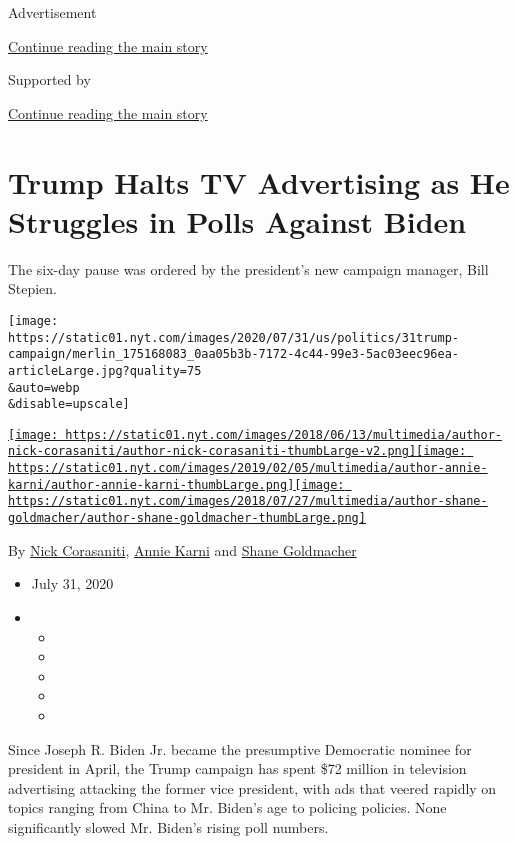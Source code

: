 Advertisement

\protect\hyperlink{after-top}{Continue reading the main story}

Supported by

\protect\hyperlink{after-sponsor}{Continue reading the main story}

\hypertarget{trump-halts-tv-advertising-as-he-struggles-in-polls-against-biden}{%
\section{Trump Halts TV Advertising as He Struggles in Polls Against
Biden}\label{trump-halts-tv-advertising-as-he-struggles-in-polls-against-biden}}

The six-day pause was ordered by the president's new campaign manager,
Bill Stepien.

\texttt{[image: https://static01.nyt.com/images/2020/07/31/us/politics/31trump-campaign/merlin\_175168083\_0aa05b3b-7172-4c44-99e3-5ac03eec96ea-articleLarge.jpg?quality=75\\\&auto=webp\\\&disable=upscale]}

\href{https://www.nytimes.com/by/nick-corasaniti}{\texttt{[image: https://static01.nyt.com/images/2018/06/13/multimedia/author-nick-corasaniti/author-nick-corasaniti-thumbLarge-v2.png]}}\href{https://www.nytimes.com/by/annie-karni}{\texttt{[image: https://static01.nyt.com/images/2019/02/05/multimedia/author-annie-karni/author-annie-karni-thumbLarge.png]}}\href{https://www.nytimes.com/by/shane-goldmacher}{\texttt{[image: https://static01.nyt.com/images/2018/07/27/multimedia/author-shane-goldmacher/author-shane-goldmacher-thumbLarge.png]}}

By \href{https://www.nytimes.com/by/nick-corasaniti}{Nick Corasaniti},
\href{https://www.nytimes.com/by/annie-karni}{Annie Karni} and
\href{https://www.nytimes.com/by/shane-goldmacher}{Shane Goldmacher}

\begin{itemize}
\item
  July 31, 2020
\item
  \begin{itemize}
  \item
  \item
  \item
  \item
  \item
  \end{itemize}
\end{itemize}

Since Joseph R. Biden Jr. became the presumptive Democratic nominee for
president in April, the Trump campaign has spent \$72 million in
television advertising attacking the former vice president, with ads
that veered rapidly on topics ranging from China to Mr. Biden's age to
policing policies. None significantly slowed Mr. Biden's rising poll
numbers.

